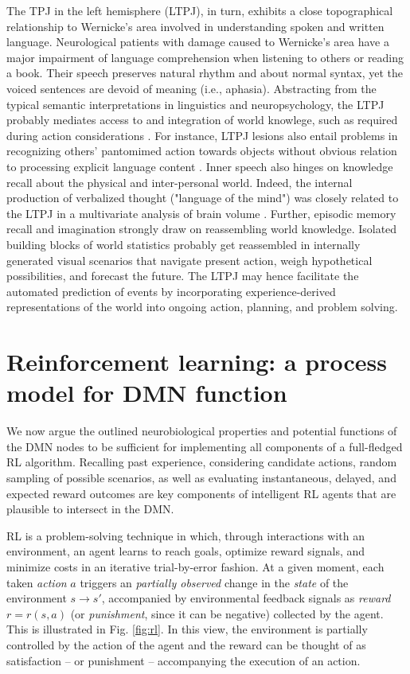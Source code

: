 \documentclass[10pt,letterpaper]{article}
\begin{document}
The TPJ in the left hemisphere (LTPJ), in turn, exhibits a close topographical relationship to Wernicke's area
involved in understanding spoken and written language.
Neurological patients with damage caused to Wernicke's area
have a major impairment of language comprehension
when listening to others or reading a book.
Their speech
preserves natural rhythm and about normal syntax, yet the
voiced sentences are devoid of meaning (i.e., aphasia).
Abstracting from the typical semantic interpretations in linguistics
and neuropsychology,
the LTPJ probably mediates access to and integration of world knowlege,
such as required during action considerations
\citep{binder2011neurobiology, seghier2013angular}.
For instance, LTPJ lesions also entail problems in recognizing
others' pantomimed action towards objects
without obvious relation to processing explicit language content
\citep{varney1987locus}.
%
Inner speech also hinges on knowledge recall
about the physical and inter-personal world.
Indeed,
the internal production of
verbalized thought ("language of the mind") was closely related to the LTPJ
in a multivariate analysis of brain volume
\citep{geva2011neural}.
Further,
episodic memory recall and imagination strongly draw on
reassembling world knowledge.
Isolated building blocks of world statistics probably get reassembled
in internally generated visual scenarios that
navigate present action, weigh hypothetical possibilities, and forecast the future.
%
The LTPJ may hence facilitate the automated prediction of events
by incorporating experience-derived representations of the world
into ongoing action, planning, and problem solving.



\section{Reinforcement learning: a process model for DMN function}
We now argue the outlined neurobiological properties
and potential functions of the DMN nodes
to be sufficient for implementing all components
of a full-fledged RL algorithm.
Recalling past experience, considering candidate actions,
random sampling of possible scenarios, as well as
evaluating instantaneous, delayed, and expected reward outcomes
are key components of intelligent RL agents
that are plausible to intersect in the DMN.


RL is a problem-solving technique in which, through interactions with an environment,
an agent learns to reach goals, optimize reward signals, and minimize costs
in an iterative trial-by-error fashion.
At a given moment, each taken \textit{action} $a$ triggers an \textit{partially observed} change
in the \textit{state} of the environment
$s \rightarrow s'$, accompanied by environmental feedback signals as \textit{reward}
$r = r(s, a)$ (or \textit{punishment},
since it can be negative) collected by the
agent. This is illustrated in Fig. \ref{fig:rl}.
In this view, the environment is partially controlled by
the action of the agent and the reward can be thought
of as satisfaction -- or punishment -- accompanying the execution of
an action.
\end{document}
